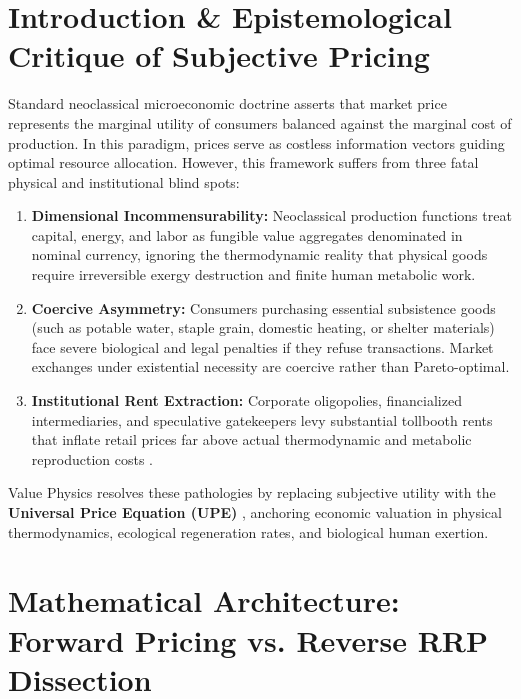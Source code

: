 \documentclass[preprint,12pt,authoryear]{elsarticle}
\begin{document}
\section{Introduction \& Epistemological Critique of Subjective Pricing}
Standard neoclassical microeconomic doctrine asserts that market price represents the marginal utility of consumers balanced against the marginal cost of production. In this paradigm, prices serve as costless information vectors guiding optimal resource allocation. However, this framework suffers from three fatal physical and institutional blind spots:
\begin{enumerate}
    \item \textbf{Dimensional Incommensurability:} Neoclassical production functions treat capital, energy, and labor as fungible value aggregates denominated in nominal currency, ignoring the thermodynamic reality that physical goods require irreversible exergy destruction \citep{georgescu1971entropy} and finite human metabolic work.
    \item \textbf{Coercive Asymmetry:} Consumers purchasing essential subsistence goods (such as potable water, staple grain, domestic heating, or shelter materials) face severe biological and legal penalties if they refuse transactions. Market exchanges under existential necessity are coercive rather than Pareto-optimal.
    \item \textbf{Institutional Rent Extraction:} Corporate oligopolies, financialized intermediaries, and speculative gatekeepers levy substantial tollbooth rents that inflate retail prices far above actual thermodynamic and metabolic reproduction costs \citep{soddy1926wealth, sraffa1960production}.
\end{enumerate}

Value Physics resolves these pathologies by replacing subjective utility with the \textbf{Universal Price Equation (UPE)} \citep{hamilton2026vpe21, hamilton2026vpe49}, anchoring economic valuation in physical thermodynamics, ecological regeneration rates, and biological human exertion.

\section{Mathematical Architecture: Forward Pricing vs. Reverse RRP Dissection}
\end{document}
